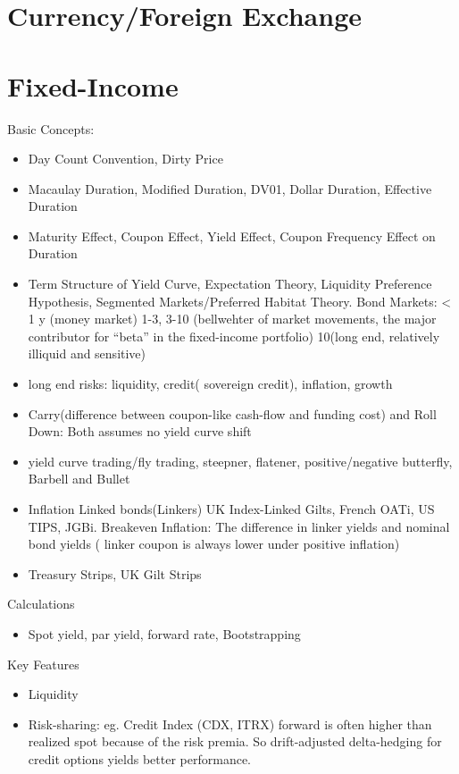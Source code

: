 \documentclass[11pt, openany]{book}              %
\begin{document}
\section{Currency/Foreign Exchange}
\section{Fixed-Income}
Basic Concepts:
\begin{itemize}
    \item Day Count Convention, Dirty Price
    \item Macaulay Duration, Modified Duration, DV01, Dollar Duration, Effective Duration
    \item Maturity Effect, Coupon Effect, Yield Effect, Coupon Frequency Effect on Duration
    \item Term Structure of Yield Curve, Expectation Theory, Liquidity Preference Hypothesis, Segmented Markets/Preferred Habitat Theory. Bond Markets: < 1 y (money market) 1-3, 3-10 (bellwehter of market movements, the major contributor for “beta” in the fixed-income portfolio) 10(long end, relatively illiquid and sensitive) 
    \item long end risks: liquidity, credit( sovereign credit), inflation, growth
    \item Carry(difference between coupon-like cash-flow and funding cost) and Roll Down: Both assumes no yield curve shift
    \item yield curve trading/fly trading, steepner, flatener, positive/negative butterfly, Barbell and Bullet
    \item Inflation Linked bonds(Linkers) UK Index-Linked Gilts, French OATi, US TIPS, JGBi. Breakeven Inflation: The difference in linker yields and nominal bond yields ( linker coupon is always lower under positive inflation) 
    \item Treasury Strips, UK Gilt Strips 
\end{itemize}

Calculations
\begin{itemize}
    \item Spot yield, par yield, forward rate, Bootstrapping
\end{itemize}


Key Features

\begin{itemize}
	\item Liquidity
	\item Risk-sharing: eg. Credit Index (CDX, ITRX) forward is often higher than realized spot because of the risk premia. So drift-adjusted delta-hedging for credit options yields better performance.
\end{itemize}
\end{document}
